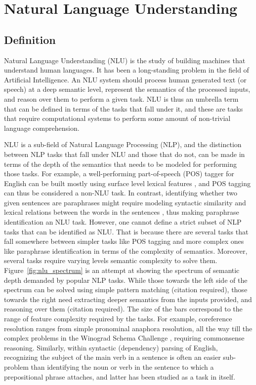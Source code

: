 \section{Natural Language Understanding}
\subsection{Definition}
Natural Language Understanding (NLU) is the study of building machines that understand human languages. It has been a long-standing problem in the field of
Artificial Intelligence. An NLU system should process human generated text (or speech) at a deep semantic level, represent the semantics
of the processed inputs, and reason over them to perform a given task. NLU is thus an umbrella term that can be defined in terms of the tasks that fall under it, and
these are tasks that require computational systems to perform some amount of non-trivial language comprehension.

NLU is a sub-field of Natural Language Processing (NLP),
and the distinction between NLP tasks that fall under NLU and those that do not, can be made in terms of the depth of the semantics that needs to be modeled
for performing those tasks.
For example, a well-performing part-of-speech (POS) tagger for English can be built mostly using surface level lexical features \citep{toutanova2003feature}, and POS tagging can
thus be considered a non-NLU task. In contrast, identifying whether two given sentences are paraphrases might require modeling syntactic similarity and lexical relations between the words in the sentences \citep{das2009paraphrase},
thus making paraphrase identification an NLU task. However, one cannot define a strict subset of NLP tasks that can be identified as NLU\@. That is because there are several tasks that fall somewhere between simpler tasks like POS tagging and more complex ones like paraphrase identification
in terms of the complexity of semantics.
Moreover, several tasks require varying levels semantic complexity to solve them.
Figure~\ref{fig:nlu_spectrum} is an attempt at showing the spectrum of semantic depth demanded by popular NLP tasks.
While those towards the left side of the spectrum can be solved using simple pattern matching (citation required),
those towards the right need extracting deeper semantics from the inputs provided, and reasoning over them (citation required).
The size of the bars correspond to the range of feature complexity required by the tasks.
For example, coreference resolution ranges from simple pronominal anaphora resolution, all the way till the complex problems in the
Winograd Schema Challenge \citep{levesque2012winograd}, requiring commonsense reasoning. Similarly, within syntactic (dependency) parsing of English, recognizing the subject of the main verb in a
sentence is often an easier sub-problem than identifying the noun or verb in the sentence to which a
prepositional phrase attaches, and latter has been studied as a task in itself.

